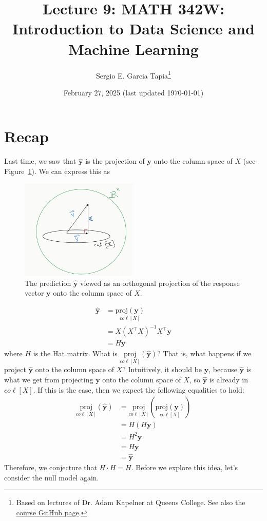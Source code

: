 \documentclass[12pt, a4paper]{article}
\title{Lecture 9: MATH 342W: Introduction to Data Science and Machine Learning}
\author{Sergio E. Garcia Tapia\thanks{Based on lectures of Dr. Adam Kapelner at Queens College.
See also the \href{https://github.com/kapelner/QC_MATH_342W_Spring_2025}{course GitHub page}.}}
\date{February 27, 2025 (last updated \today)}
\theoremstyle{definition}
\begin{document}
	\maketitle
	\section*{Recap}
	Last time, we saw that $\hat{\mathbf{y}}$ is the projection of $\mathbf{y}$ onto
	the column space of $X$ (see Figure~\ref{fig:prediction-space}). We can express
	this as
	\begin{figure}
		\centering
		\includegraphics[width=0.5\textwidth]{prediction-orthogonal-projection}
		\caption{The prediction $\hat{\mathbf{y}}$ viewed as an orthogonal
			projection of the response vector $\mathbf{y}$ onto the column space of $X$.}
		\label{fig:prediction-space}
	\end{figure}
	\begin{align*}
		\hat{\mathbf{y}}& = \underset{co\ell[X]}{\text{proj}(\mathbf{y})}\\
		&=X(X^\top X)^{-1}X^\top \mathbf{y}\\
		&=H\mathbf{y}
	\end{align*}
	where $H$ is the Hat matrix. What is $\underset{co\ell[X]}{\text{proj}}(\hat{\mathbf{y}})$?
	That is, what happens if we project $\hat{\mathbf{y}}$ onto the column space of $X$?
	Intuitively, it should be $\hat{\mathbf{y}}$, because $\hat{\mathbf{y}}$ is what
	we get from projecting $\mathbf{y}$ onto the column space of $X$, so
	$\hat{\mathbf{y}}$ is already in $co\ell[X]$. If this is the case,
	then we expect the following equalities to hold:
	\begin{align*}
		\underset{co\ell[X]}{\text{proj}}(\hat{\mathbf{y}})
		&=\underset{co\ell[X]}{\text{proj}}(\underset{co\ell[X]}{\text{proj}(\mathbf{y})})\\
		&=H(H\mathbf{y})\\
		&=H^2\mathbf{y}\\
		&=H\mathbf{y}\\
		&=\hat{\mathbf{y}}
	\end{align*}
	Therefore, we conjecture that $H\cdot H=H$. Before we explore this idea, let's consider
	the null model again.
\end{document}
